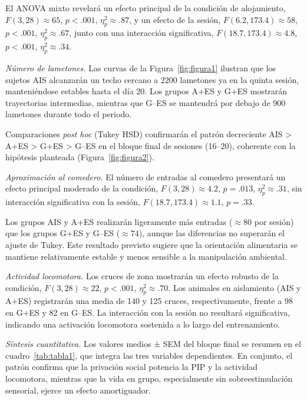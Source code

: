 \documentclass[12pt,a4paper]{article}
\begin{document}
\begin{multicols}{2}
El ANOVA mixto revelará un efecto principal de la condición de alojamiento, $F(3, 28) \approx 65$, $p < .001$, $\eta^2_p \approx .87$, y un efecto de la sesión, $F(6.2, 173.4) \approx 58$, $p < .001$, $\eta^2_p \approx .67$, junto con una interacción significativa, $F(18.7, 173.4) \approx 4.8$, $p < .001$, $\eta^2_p \approx .34$.

\textit{Número de lametones.} Las curvas de la Figura~\ref{fig:figura1} ilustran que los sujetos AIS alcanzarán un techo cercano a 2200 lametones ya en la quinta sesión, manteniéndose estables hasta el día 20. Los grupos A+ES y G+ES mostrarán trayectorias intermedias, mientras que G--ES se mantendrá por debajo de 900 lametones durante todo el periodo.

Comparaciones \textit{post hoc} (Tukey HSD) confirmarán el patrón decreciente AIS > A+ES > G+ES > G--ES en el bloque final de sesiones (16–20), coherente con la hipótesis planteada (Figura~\ref{fig:figura2}).

\textit{Aproximación al comedero.} El número de entradas al comedero presentará un efecto principal moderado de la condición, $F(3, 28) \approx 4.2$, $p = .013$, $\eta^2_p \approx .31$, sin interacción significativa con la sesión, $F(18.7, 173.4) \approx 1.1$, $p = .33$.

Los grupos AIS y A+ES realizarán ligeramente más entradas ($\approx 80$ por sesión) que los grupos G+ES y G--ES ($\approx 74$), aunque las diferencias no superarán el ajuste de Tukey. Este resultado previsto sugiere que la orientación alimentaria se mantiene relativamente estable y menos sensible a la manipulación ambiental.

\textit{Actividad locomotora.} Los cruces de zona mostrarán un efecto robusto de la condición, $F(3, 28) \approx 22$, $p < .001$, $\eta^2_p \approx .70$. Los animales en aislamiento (AIS y A+ES) registrarán una media de 140 y 125 cruces, respectivamente, frente a 98 en G+ES y 82 en G--ES. La interacción con la sesión no resultará significativa, indicando una activación locomotora sostenida a lo largo del entrenamiento.

\textit{Síntesis cuantitativa.} Los valores medios ± SEM del bloque final se resumen en el cuadro~\ref{tab:tabla1}, que integra las tres variables dependientes. En conjunto, el patrón confirma que la privación social potencia la PIP y la actividad locomotora, mientras que la vida en grupo, especialmente sin sobreestimulación sensorial, ejerce un efecto amortiguador.


\end{multicols}
\end{document}
